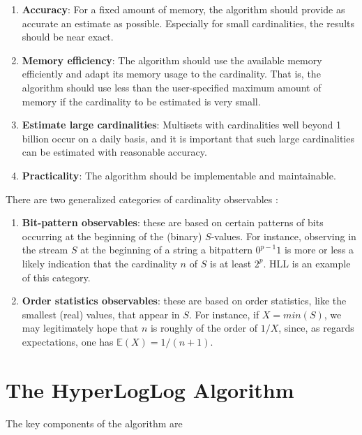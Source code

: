 \documentclass[12pt]{article}
\newlength\tindent
\renewcommand{\indent}{\hspace*{\tindent}}
\begin{document}
\begin{enumerate}
\item \textbf{Accuracy}: For a fixed amount of memory, the algorithm should
  provide as accurate an estimate as possible. Especially for small
  cardinalities, the results should be near exact.
\item \textbf{Memory efficiency}: The algorithm should use the available memory
  efficiently and adapt its memory usage to the cardinality. That is, the
  algorithm should use less than the user-specified maximum amount of memory if
  the cardinality to be estimated is very small.
\item \textbf{Estimate large cardinalities}: Multisets with cardinalities well
  beyond 1 billion occur on a daily basis, and it is important that such large
  cardinalities can be estimated with reasonable accuracy.
\item \textbf{Practicality}: The algorithm should be implementable and
  maintainable.
\end{enumerate}

There are two generalized categories of cardinality observables
\cite{Flatjolet:2007:Online}:

\begin{enumerate}
\item \textbf{Bit-pattern observables}: these are based on certain patterns of
  bits occurring at the beginning of the (binary) $S$-values. For instance,
  observing in the stream $S$ at the beginning of a string a bitpattern
  $0^{p-1}1$ is more or less a likely indication that the cardinality $n$
  of $S$ is at least $2^{p}$. HLL is an example of this category.

\item \textbf{Order statistics observables}: these are based on order statistics,
  like the smallest (real) values, that appear in $S$. For instance,
  if $X = min(S)$, we may legitimately hope that $n$ is roughly of the order of
  $1/X$, since, as regards expectations, one has $\mathbb{E}(X) = 1/(n + 1)$.
\end{enumerate}

\section{The HyperLogLog Algorithm}

\indent The key components of the algorithm are
\end{document}
